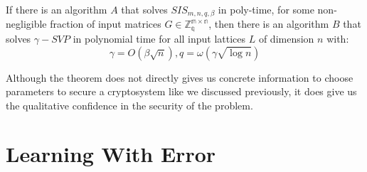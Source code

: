 \begin{theorem}
   If there is an algorithm $A$ that solves
  $SIS_{m,n,q,\beta}$ in poly-time, for some non-negligible fraction of input
  matrices $G \in \mathbb{Z_q^{m \times n}}$, then there is an algorithm $B$
  that solves $\gamma-SVP$ in polynomial time for all input lattices $L$ of
  dimension $n$ with:
  \[
    \gamma = O(\beta\sqrt{n}), q = \omega(\gamma\sqrt{\log n})
  \]
  \label{theo:AjtaiHardness}
\end{theorem}

Although the theorem does not directly gives us concrete information to choose
parameters to secure a cryptosystem like we discussed previously, it does give
us the qualitative confidence in the security of the problem.

\section{Learning With Error}
\label{sub:LWE}
